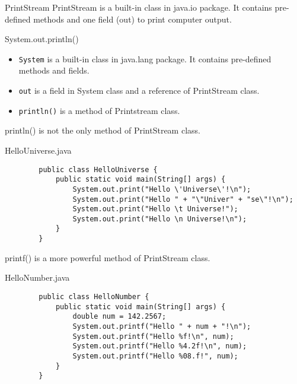 \documentclass[10pt, compress]{beamer}
\begin{document}
\begin{slide}
	\begin{block}{PrintStream}
		PrintStream is a built-in class in java.io package. It contains pre-defined methods and one field (out) to print computer output.
	\end{block}
	\begin{block}{System.out.println()}
		\begin{itemize}
			\item[] \texttt{System} is a built-in class in java.lang package. It contains pre-defined methods and fields.
			\item[] \texttt{out} is a field in System class and a reference of PrintStream class.
			\item[] \texttt{println()} is a method of Printstream class.
		\end{itemize}
	\end{block}
\end{slide}

\begin{slide}
	println() is not the only method of PrintStream class.
	\begin{block}{HelloUniverse.java}
	\begin{verbatim}
		public class HelloUniverse {
		    public static void main(String[] args) {
		        System.out.print("Hello \'Universe\'!\n");
		        System.out.print("Hello " + "\"Univer" + "se\"!\n");
		        System.out.print("Hello \t Universe!");
		        System.out.print("Hello \n Universe!\n");
		    }
		}
	\end{verbatim}
	\end{block}
\end{slide}

\begin{slide}
	printf() is a more powerful method of PrintStream class.
	\begin{block}{HelloNumber.java}
	\begin{verbatim}
		public class HelloNumber {
		    public static void main(String[] args) {
		        double num = 142.2567;
		        System.out.printf("Hello " + num + "!\n");
		        System.out.printf("Hello %f!\n", num);
		        System.out.printf("Hello %4.2f!\n", num);
		        System.out.printf("Hello %08.f!", num);
		    }
		}
	\end{verbatim}
	\end{block}
\end{slide}
\end{document}
